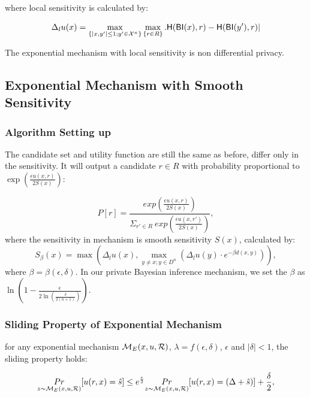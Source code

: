 where local sensitivity is calculated by:

\begin{equation*}
\Delta_{l}u(x) = 
\max_{\{|x,y'| \leq 1;y'\in \mathcal{X}^n\}}\max_{\{r\in R\}}.
\mathsf{H}(\mathsf{BI}(x), r) - \mathsf{H}(\mathsf{BI}(y'), r)|
\end{equation*}

The exponential mechanism with local sensitivity is non differential privacy\cite{dwork2014algorithmic}.


\subsection{Exponential Mechanism with Smooth Sensitivity}
\label{sec_smoo}

\subsubsection{Algorithm Setting up}
The candidate set and utility function are still the same as before, differ only in the sensitivity. It will output a candidate $r \in R$ with probability proportional to $\exp(\frac{\epsilon u(x,r)}{2 S(x)})$:

\begin{equation*}
P[r] = \frac
{exp(\frac{\epsilon u(x,r)}{2 S(x)})}
{\Sigma_{r' \in R}\ exp(\frac{\epsilon u(x,r')}{2 S(x)})},
\end{equation*}
where the sensitivity in mechanism is smooth sensitivity $S(x)$\cite{nissim2007smooth}, calculated by:
\begin{equation*}
S_{\beta}(x) = \max(\Delta_{l}u(x), \max_{y \neq x; y \in D^{n}}(\Delta_{l}u(y)\cdot e^{-\beta d(x,y)})),
\end{equation*}
where $\beta = \beta(\epsilon, \delta)$. In our private Bayesian inference mechanism, we set the $\beta$ as $\ln(1 - \frac{\epsilon}{2 \ln (\frac{\delta}{2 (n + 1)})})$. 

\subsubsection{Sliding Property of Exponential Mechanism}
\begin{lem}
for any exponential mechanism $\mathcal{M}_E(x, u, \mathcal{R})$, $\lambda = f(\epsilon, \delta)$, $\epsilon$ and $|\delta| < 1$, the sliding property holds:

\begin{equation*}
\underset{z \thicksim \mathcal{M}_E(x, u, \mathcal{R})}{Pr}[u(r,x) = \hat{s}]
\leq
e^{\frac{\epsilon}{2}} \underset{z \thicksim \mathcal{M}_E(x, u, \mathcal{R})}{Pr}[u(r,x) = (\Delta + \hat{s})] + \frac{\delta}{2},
\end{equation*}

\end{lem}


